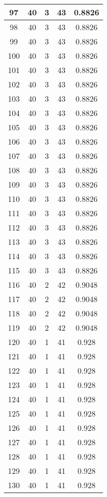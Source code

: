 \documentclass[letterpaper, 12pt]{article}
\begin{document}
\begin{longtable}{|c|c|c|c|c|}
\hline
97 & 40 & 3 & 43 & 0.8826 \\
\hline
98 & 40 & 3 & 43 & 0.8826 \\
\hline
99 & 40 & 3 & 43 & 0.8826 \\
\hline
100 & 40 & 3 & 43 & 0.8826 \\
\hline
101 & 40 & 3 & 43 & 0.8826 \\
\hline
102 & 40 & 3 & 43 & 0.8826 \\
\hline
103 & 40 & 3 & 43 & 0.8826 \\
\hline
104 & 40 & 3 & 43 & 0.8826 \\
\hline
105 & 40 & 3 & 43 & 0.8826 \\
\hline
106 & 40 & 3 & 43 & 0.8826 \\
\hline
107 & 40 & 3 & 43 & 0.8826 \\
\hline
108 & 40 & 3 & 43 & 0.8826 \\
\hline
109 & 40 & 3 & 43 & 0.8826 \\
\hline
110 & 40 & 3 & 43 & 0.8826 \\
\hline
111 & 40 & 3 & 43 & 0.8826 \\
\hline
112 & 40 & 3 & 43 & 0.8826 \\
\hline
113 & 40 & 3 & 43 & 0.8826 \\
\hline
114 & 40 & 3 & 43 & 0.8826 \\
\hline
115 & 40 & 3 & 43 & 0.8826 \\
\hline
116 & 40 & 2 & 42 & 0.9048 \\
\hline
117 & 40 & 2 & 42 & 0.9048 \\
\hline
118 & 40 & 2 & 42 & 0.9048 \\
\hline
119 & 40 & 2 & 42 & 0.9048 \\
\hline
120 & 40 & 1 & 41 & 0.928 \\
\hline
121 & 40 & 1 & 41 & 0.928 \\
\hline
122 & 40 & 1 & 41 & 0.928 \\
\hline
123 & 40 & 1 & 41 & 0.928 \\
\hline
124 & 40 & 1 & 41 & 0.928 \\
\hline
125 & 40 & 1 & 41 & 0.928 \\
\hline
126 & 40 & 1 & 41 & 0.928 \\
\hline
127 & 40 & 1 & 41 & 0.928 \\
\hline
128 & 40 & 1 & 41 & 0.928 \\
\hline
129 & 40 & 1 & 41 & 0.928 \\
\hline
130 & 40 & 1 & 41 & 0.928 \\

\end{longtable}
\end{document}
